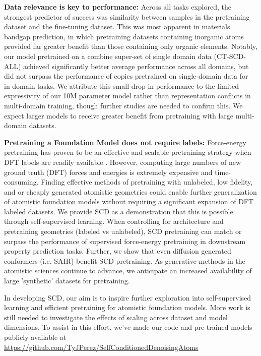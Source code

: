 \textbf{Data relevance is key to performance:}
Across all tasks explored, the strongest predictor of success was similarity between samples in the pretraining dataset and the fine-tuning dataset. This was most apparent in materials bandgap prediction, in which pretraining datasets containing inorganic atoms provided far greater benefit than those containing only organic elements. Notably, our model pretrained on a combine super-set of single domain data (CT-SCD-ALL) achieved significantly better average performance across all domains, but did not surpass the performance of copies pretrained on single-domain data for in-domain tasks. We attribute this small drop in performance to the limited expressivity of our 10M parameter model rather than representation conflicts in multi-domain training, though further studies are needed to confirm this. We expect larger models to receive greater benefit from pretraining with large multi-domain datasets.


\textbf{Pretraining a Foundation Model does not require labels:}
Force-energy pretraining has proven to be an effective and scalable pretraining strategy when DFT labels are readily available \cite{JMP_Shoghi2023, HackNIP_kim2025}. However, computing large numbers of new ground truth (DFT) forces and energies is extremely expensive and time-consuming. Finding effective methods of pretraining with unlabeled, low fidelity, and or cheaply generated atomistic geometries could enable further generalization of atomistic foundation models without requiring a significant expansion of DFT labeled datasets. We provide SCD as a demonstration that this is possible through self-supervised learning. When controlling for architecture and pretraining geometries (labeled vs unlabeled), SCD pretraining can match or surpass the performance of supervised force-energy pretraining in downstream property prediction tasks. Further, we show that even diffusion generated conformers (i.e. SAIR) benefit SCD pretraining. As generative methods in the atomistic sciences continue to advance, we anticipate an increased availability of large 'synthetic' datasets for pretraining. 

In developing SCD, our aim is to inspire further exploration into self-supervised learning and efficient pretraining for atomistic foundation models. More work is still needed to investigate the effects of scaling across dataset and model dimensions. To assist in this effort, we've made our code and pre-trained models publicly available at \url{https://github.com/TyJPerez/SelfConditionedDenoisingAtoms}





